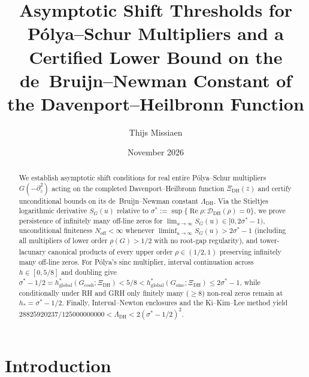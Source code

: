 \documentclass[11pt,a4paper,reqno]{amsart}
\title[Shift Thresholds and $\Lambda_{\mathrm{DH}}$ Bounds]{Asymptotic Shift Thresholds for P\'olya--Schur Multipliers and a Certified Lower Bound on the de~Bruijn--Newman Constant of the Davenport--Heilbronn Function}
\author{Thijs Missiaen}
\date{November 2026}
\theoremstyle{definition}
\theoremstyle{remark}
\numberwithin{equation}{section}
\DeclareMathOperator{\Reop}{Re}
\begin{document}
\begin{abstract}
We establish asymptotic shift conditions for real entire P\'olya--Schur multipliers $G(-\partial_z^2)$ acting on the completed Davenport--Heilbronn function $\Xi_{\mathrm{DH}}(z)$ and certify unconditional bounds on its de~Bruijn--Newman constant $\Lambda_{\mathrm{DH}}$. Via the Stieltjes logarithmic derivative $S_G(u)$ relative to $\sigma^* := \sup\{\Reop\rho : \mathcal{D}_{\mathrm{DH}}(\rho) = 0\}$, we prove persistence of infinitely many off-line zeros for $\lim_{u\to\infty} S_G(u) \in [0, 2\sigma^* - 1)$, unconditional finiteness $N_{\mathrm{off}} < \infty$ whenever $\liminf_{u\to\infty} S_G(u) > 2\sigma^* - 1$ (including all multipliers of lower order $\underline{\rho}(G) > 1/2$ with no root-gap regularity), and tower-lacunary canonical products of every upper order $\rho \in (1/2, 1)$ preserving infinitely many off-line zeros. For P\'olya's sinc multiplier, interval continuation across $h \in [0, 5/8]$ and doubling give $\sigma^* - 1/2 = h_{\mathrm{global}}^*(G_{\mathrm{cosh}}; \Xi_{\mathrm{DH}}) < 5/8 < h_{\mathrm{global}}^*(G_{\mathrm{sinc}}; \Xi_{\mathrm{DH}}) \le 2\sigma^* - 1$, while conditionally under RH and GRH only finitely many ($\ge 8$) non-real zeros remain at $h_* = \sigma^* - 1/2$. Finally, Interval--Newton enclosures and the Ki--Kim--Lee method yield $28825920237/125000000000 < \Lambda_{\mathrm{DH}} < 2(\sigma^* - 1/2)^2$.
\end{abstract}

\maketitle

\section{Introduction}
\label{sec:intro}
\end{document}
